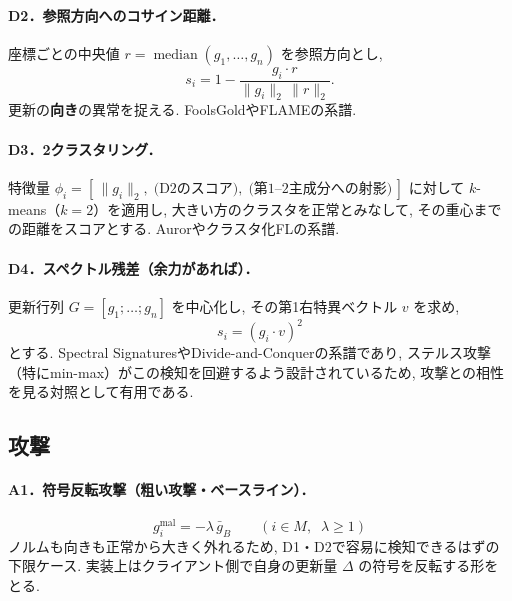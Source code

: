 \documentclass[a4j, twocolumn, dvipdfmx]{jsarticle}
\begin{document}
\paragraph{D2．参照方向へのコサイン距離．}
座標ごとの中央値 $r = \operatorname{median}(g_1,\dots,g_n)$ を参照方向とし,
\begin{equation}
s_i = 1 - \frac{g_i \cdot r}{\|g_i\|_2\,\|r\|_2}.
\end{equation}
更新の\textbf{向き}の異常を捉える. FoolsGold\cite{fung2020limitations}やFLAME\cite{nguyen2022flame}の系譜.

\paragraph{D3．2クラスタリング．}
特徴量 $\phi_i = [\,\|g_i\|_2,\; \text{(D2のスコア)},\; \text{(第1--2主成分への射影)}\,]$ に対して $k$-means（$k=2$）を適用し, 大きい方のクラスタを正常とみなして, その重心までの距離をスコアとする. Auror\cite{shen2016auror}やクラスタ化FL\cite{sattler2020byzantine}の系譜.

\paragraph{D4．スペクトル残差（余力があれば）．}
更新行列 $G = [g_1;\dots;g_n]$ を中心化し, その第1右特異ベクトル $v$ を求め,
\begin{equation}
s_i = (g_i \cdot v)^2
\end{equation}
とする. Spectral Signatures\cite{tran2018spectral}やDivide-and-Conquer\cite{shejwalkar2021manipulating}の系譜であり, ステルス攻撃（特にmin-max）がこの検知を回避するよう設計されているため, 攻撃との相性を見る対照として有用である.

\subsection{攻撃}
\label{sec:attacks}

\paragraph{A1．符号反転攻撃（粗い攻撃・ベースライン）．}
\begin{equation}
g_i^{\text{mal}} = -\lambda\, \bar{g}_B \qquad (i \in M,\;\; \lambda \ge 1)
\end{equation}
ノルムも向きも正常から大きく外れるため, D1・D2で容易に検知できるはずの下限ケース. 実装上はクライアント側で自身の更新量 $\Delta$ の符号を反転する形をとる.
\end{document}
